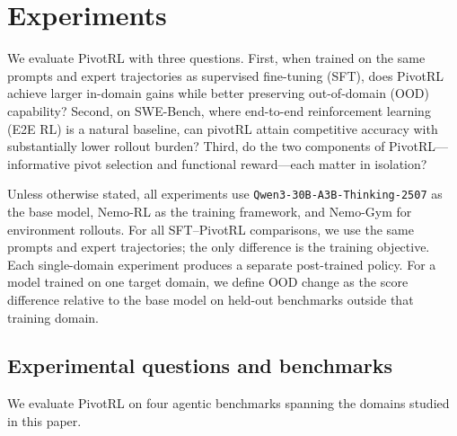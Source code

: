 \section{Experiments}
\label{sec:experiments}

We evaluate PivotRL with three questions. First, when trained on the same prompts and expert trajectories as supervised fine-tuning (SFT), does PivotRL achieve larger in-domain gains while better preserving out-of-domain (OOD) capability? Second, on SWE-Bench, where end-to-end reinforcement learning (E2E RL) is a natural baseline, can pivotRL attain competitive accuracy with substantially lower rollout burden? Third, do the two components of PivotRL---informative pivot selection and functional reward---each matter in isolation?

Unless otherwise stated, all experiments use \texttt{Qwen3-30B-A3B-Thinking-2507} as the base model, Nemo-RL \citep{nemo-rl} as the training framework, and Nemo-Gym \citep{nemo-gym} for environment rollouts. For all SFT--PivotRL comparisons, we use the same prompts and expert trajectories; the only difference is the training objective. Each single-domain experiment produces a separate post-trained policy. For a model trained on one target domain, we define OOD change as the score difference relative to the base model on held-out benchmarks outside that training domain.

\subsection{Experimental questions and benchmarks}
\label{sec:exp_questions_benchmarks}

We evaluate PivotRL on four agentic benchmarks spanning the domains studied in this paper.

